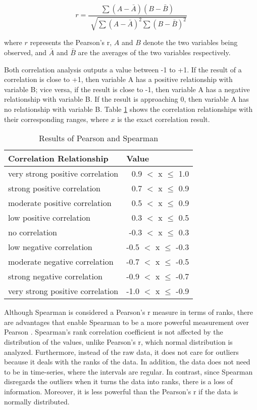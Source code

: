 \begin {equation}
r = \frac{\sum (A - \bar{A})(B - \bar{B})}{\sqrt[]{\sum (A - \bar{A})^2 \sum(B - \bar{B})^2}}
\end{equation}

\noindent where $r$ represents the Pearson’s r, $A$ and $B$ denote the two variables being observed, and $\bar{A}$ and $\bar{B}$ are the averages of the two variables respectively. 

Both correlation analysis outputs a value between -1 to +1. If the result of a correlation is close to +1, then variable A has a positive relationship with variable B; vice versa, if the result is close to -1, then variable A has a negative relationship with variable B. If the result is approaching 0, then variable A has no relationship with variable B. Table \ref{table:correlation-results} shows the correlation relationships with their corresponding ranges, where $x$ is the exact correlation result. 


\begin{table}[h]
\centering
\caption{Results of Pearson and Spearman}
\label{table:correlation-results}
\begin{tabular}{|l|r|}
\hline
Correlation Relationship         & \multicolumn{1}{l|}{Value}        \\ \hline
very strong positive correlation & 0.9 $<$ x $\leq$ 1.0   \\ \hline
strong positive correlation      & 0.7 $<$ x $\leq$ 0.9   \\ \hline
moderate positive correlation    & 0.5 $<$ x $\leq$ 0.9   \\ \hline
low positive correlation         & 0.3 $<$ x $\leq$ 0.5   \\ \hline
no correlation                   & -0.3 $<$ x $\leq$ 0.3  \\ \hline
low negative correlation         & -0.5 $<$ x $\leq$ -0.3 \\ \hline
moderate negative correlation    & -0.7 $<$ x $\leq$ -0.5 \\ \hline
strong negative correlation      & -0.9 $<$ x $\leq$ -0.7 \\ \hline
very strong positive correlation & -1.0 $<$ x $\leq$ -0.9 \\ \hline
\end{tabular}
\end{table}

Although Spearman is considered a Pearson’s r measure in terms of ranks, there are advantages that enable Spearman to be a more powerful measurement over Pearson . Spearman’s rank correlation coefficient is not affected by the distribution of the values, unlike Pearson’s r, which normal distribution is analyzed. Furthermore, instead of the raw data, it does not care for outliers because it deals with the ranks of the data. In addition, the data does not need to be in time-series, where the intervals are regular. In contrast, since Spearman disregards the outliers when it turns the data into ranks, there is a loss of information. Moreover, it is less powerful than the Pearson’s r if the data is normally distributed.

